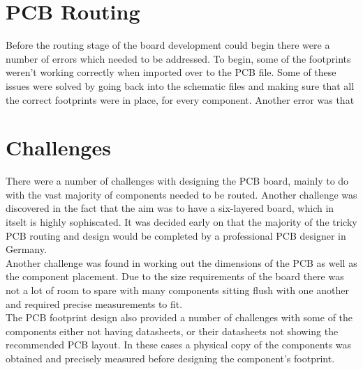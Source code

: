 \section{PCB Routing}
\label{chap6sec6}

	Before the routing stage of the board development could begin there were a number of errors which needed to be addressed. To begin, some of the footprints weren't working correctly when imported over to the PCB file. Some of these issues were solved by going back into the schematic files and making sure that all the correct footprints were in place, for every component. Another error was that 


\section{Challenges}
\label{chap6sec7}

	There were a number of challenges with designing the PCB board, mainly to do with the vast majority of components needed to be routed. Another challenge was discovered in the fact that the aim was to have a six-layered board, which in itselt is highly sophiscated. It was decided early on that the majority of the tricky PCB routing and design would be completed by a professional PCB designer in Germany.\\
Another challenge was found in working out the dimensions of the PCB as well as the component placement. Due to the size requirements of the board there was not a lot of room to spare with many components sitting flush with one another and required precise measurements to fit. \\
The PCB footprint design also provided a number of challenges with some of the components either not having datasheets, or their datasheets not showing the recommended PCB layout. In these cases a physical copy of the components was obtained and precisely measured before designing the component's footprint.











